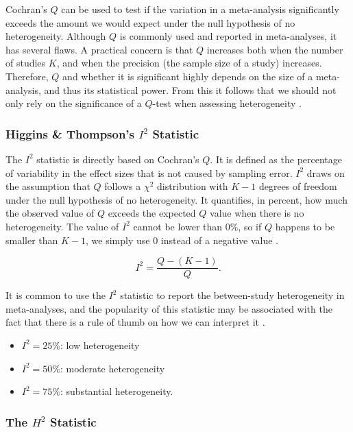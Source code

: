 \documentclass[../../../main.tex]{subfiles}
\begin{document}
Cochran's $Q$ can be used to test if the variation in a meta-analysis significantly exceeds the amount we would expect under the null hypothesis of no heterogeneity. Although $Q$ is commonly used and reported in meta-analyses, it has several flaws. A practical concern is that $Q$ increases both when the number of studies $K$, and when the precision (the sample size of a study) increases. Therefore, $Q$ and whether it is significant highly depends on the size of a meta-analysis, and thus its statistical power. From this it follows that we should not only rely on the significance of a $Q$-test when assessing heterogeneity \autocite{Harrer2021}.

\subsubsection{Higgins \& Thompson's $I^2$ Statistic}

The $I^2$ statistic is directly based on Cochran's $Q$. It is defined as the percentage of variability in the effect sizes that is not caused by sampling error. $I^2$ draws on the assumption that $Q$ follows a $\chi^2$ distribution with $K-1$ degrees of freedom under the null hypothesis of no heterogeneity. It quantifies, in percent, how much the observed value of $Q$ exceeds the expected $Q$ value when there is no heterogeneity. The value of $I^2$ cannot be lower than 0\%, so if $Q$ happens to be smaller than $K-1$, we simply use 0 instead of a negative value \autocite{Harrer2021}.

\begin{equation}
I^2 = \frac{Q-(K-1)}{Q}.
\end{equation}

It is common to use the $I^2$ statistic to report the between-study heterogeneity in meta-analyses, and the popularity of this statistic may be associated with the fact that there is a rule of thumb on how we can interpret it \autocite{Harrer2021}.

\begin{itemize}
\item $I^2=25\%$: low heterogeneity
\item $I^2=50\%$: moderate heterogeneity
\item $I^2=75\%$: substantial heterogeneity.
\end{itemize}

\subsubsection{The $H^2$ Statistic}
\end{document}
